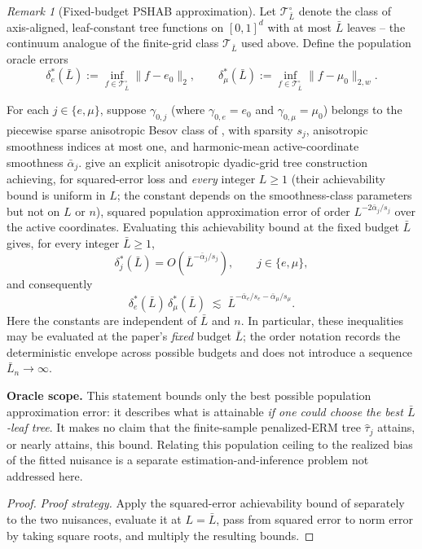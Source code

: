 \documentclass[11pt]{article}
\theoremstyle{plain}
\theoremstyle{definition}
\theoremstyle{remark}
\newtheorem{remark}[theorem]{Remark}
\newcommand{\cT}{\mathcal{T}}
\newcommand{\ez}{e_0}
\newcommand{\mz}{\mu_0}
\newcommand{\that}{\widehat{\tau}}
\newcommand{\Ltwo}[1]{\lVert #1 \rVert_{2}}
\newcommand{\Lw}[1]{\lVert #1 \rVert_{2,w}}
\begin{document}
\begin{remark}[Fixed-budget PSHAB approximation]\label{rem:pshab-fixed-budget}
Let $\cT_{\bar L}^{\circ}$ denote the class of axis-aligned, leaf-constant tree
functions on $[0,1]^d$ with at most $\bar L$ leaves -- the continuum analogue
of the finite-grid class $\cT_{\bar L}$ used above. Define the population
oracle errors
\[
  \delta_e^*(\bar L)
  :=\inf_{f\in\cT_{\bar L}^{\circ}}\Ltwo{f-\ez},
  \qquad
  \delta_\mu^*(\bar L)
  :=\inf_{f\in\cT_{\bar L}^{\circ}}\Lw{f-\mz}.
\]

For each $j\in\{e,\mu\}$, suppose $\gamma_{0,j}$ (where $\gamma_{0,e}=\ez$ and
$\gamma_{0,\mu}=\mz$) belongs to the piecewise sparse anisotropic Besov
class of \citet[Definition~4.5]{xu2026}, with sparsity $s_j$, anisotropic
smoothness indices at most one, and harmonic-mean active-coordinate smoothness
$\bar\alpha_j$. \citet[Theorems~5.5 and~6.1]{xu2026} give an explicit
anisotropic dyadic-grid tree construction achieving, for squared-error loss
and \emph{every} integer $L\ge1$ (their achievability bound is uniform in $L$;
the constant depends on the smoothness-class parameters but not on $L$ or
$n$), squared population approximation error of order $L^{-2\bar\alpha_j/s_j}$
over the active coordinates. Evaluating this achievability bound at the fixed
budget $\bar L$ gives, for every integer $\bar L\ge1$,
\[
  \delta_j^*(\bar L)
  =O\!\left(\bar L^{-\bar\alpha_j/s_j}\right),
  \qquad j\in\{e,\mu\},
\]
and consequently
\[
  \delta_e^*(\bar L)\,\delta_\mu^*(\bar L)
  \;\lesssim\;
  \bar L^{-\bar\alpha_e/s_e-\bar\alpha_\mu/s_\mu}.
\]
Here the constants are independent of $\bar L$ and $n$.  In particular, these
inequalities may be evaluated at the paper's \emph{fixed} budget $\bar L$;
the order notation records the deterministic envelope across possible budgets
and does not introduce a sequence $\bar L_n\to\infty$.

\textbf{Oracle scope.}
This statement bounds only the best possible population approximation error:
it describes what is attainable \emph{if one could choose the best
$\bar L$-leaf tree}.  It makes no claim that the finite-sample penalized-ERM
tree $\that_j$ attains, or nearly attains, this bound.  Relating this population
ceiling to the realized bias of the fitted nuisance is a separate
estimation-and-inference problem not addressed here.

\begin{proof}
\emph{Proof strategy.}
Apply the squared-error achievability bound of \citet[Thms.~5.5,
6.1]{xu2026} separately to the two nuisances, evaluate it at $L=\bar L$, pass
from squared error to norm error by taking square roots, and multiply the
resulting bounds.


\end{proof}
\end{remark}
\end{document}
